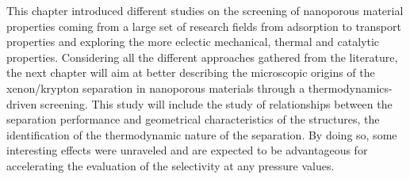 \documentclass[main.tex]{subfiles}
\begin{document}
\vspace{1cm}

This chapter introduced different studies on the screening of nanoporous material properties coming from a large set of research fields from adsorption to transport properties and exploring the more eclectic mechanical, thermal and catalytic properties. Considering all the different approaches gathered from the literature, the next chapter will aim at better describing the microscopic origins of the xenon/krypton separation in nanoporous materials through a thermodynamics-driven screening. This study will include the study of relationships between the separation performance and geometrical characteristics of the structures, the identification of the thermodynamic nature of the separation. By doing so, some interesting effects were unraveled and are expected to be advantageous for accelerating the evaluation of the selectivity at any pressure values.

\OnlyInSubfile{\printglobalbibliography}
\end{document}

